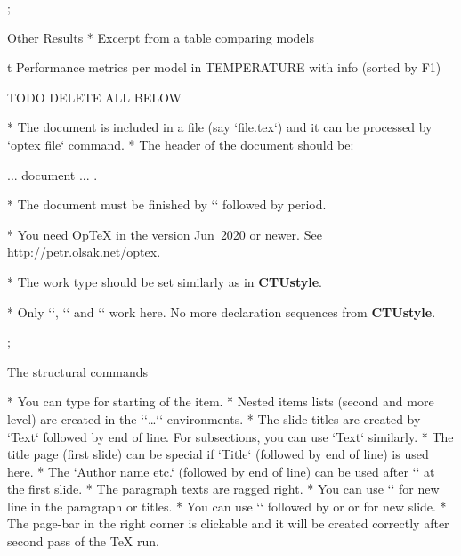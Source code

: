 \pg;

\sec Other Results
* Excerpt from a table comparing models

\midinsert {}
\caption/t Performance metrics per model in TEMPERATURE with info (sorted by F1)
\endinsert

\sec TODO DELETE ALL BELOW

* The document is included in a file (say `file.tex`)\nl
  and it can be processed by `optex file` command.
* The header of the document should be:

\begtt
\slides           %
\worktype[B/EN]   %

\slideshow        %
... document ...
\pg.
\endtt

* The document must be finished by `\pg` followed by period.

* You need OpTeX in the version Jun~2020 or newer.\nl
  See \url{http://petr.olsak.net/optex}.

* The work type should be set similarly as in {\bf\Blue CTUstyle}.

* Only `\worktype`, `\faculty` and `\department`
  work here. No more declaration sequences from {\bf\Blue CTUstyle}.

\pg; %

\sec The structural commands

* You can type \code{\*} for starting of the item.
* Nested items lists (second and more level) are created in
  the `\begitems`\dots`\enditems` environments.
* The slide titles are created by `\sec Text` 
  followed by end of line.\nl 
  For subsections, you can use `\secc Text` similarly.
* The title page (first slide) can be special if `\tit Title`\nl
  (followed by end of line) is used here.
* The `\subtit Author name etc.` (followed by end of line)
  can be used after `\tit` at the first slide.
* The paragraph texts are ragged right.
* You can use `\nl` for new line in the paragraph or titles.
* You can use `\pg` followed by \code{+} or \code{;} or 
  for new slide.
* The page-bar in the right corner is clickable and it will be 
  created correctly after second pass of the \TeX{} run.

